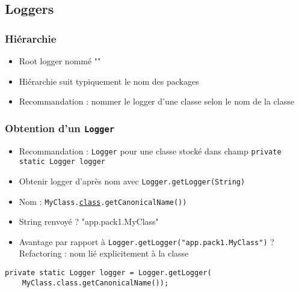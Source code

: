 \documentclass[english, french]{beamer}
\begin{document}
\subsection{Loggers}
\begin{frame}
	\frametitle{Hiérarchie}
	\begin{itemize}
		\item Root logger nommé ""
		\item Hiérarchie suit typiquement le nom des packages
		\item Recommandation : nommer le logger d’une classe selon le nom de la classe
	\end{itemize}
\end{frame}

\begin{frame}[fragile]
	\frametitle{Obtention d’un \texttt{Logger}}
	\begin{itemize}
		\item Recommandation : \texttt{Logger} pour une classe stocké dans champ \texttt{private static Logger logger}
		\item Obtenir logger d’après nom avec \texttt{Logger.getLogger(String)}
		\item Nom : \texttt{MyClass.\href{https://docs.oracle.com/javase/8/docs/api/java/lang/Class.html}{class}.getCanonicalName())}
		\item String renvoyé ? \pause "app.pack1.MyClass" \pause
		\item Avantage par rapport à  \texttt{Logger.getLogger("app.pack1.MyClass")} ? \pause Refactoring : nom lié explicitement à la classe \pause
	\end{itemize}
	\begin{lstlisting}
private static Logger logger = Logger.getLogger(
    MyClass.class.getCanonicalName());
	\end{lstlisting}
\end{frame}
\end{document}
